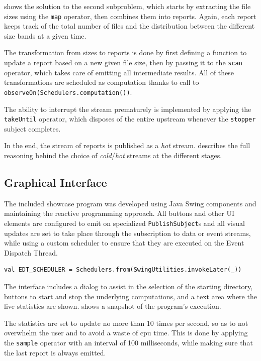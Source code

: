 \documentclass{scrartcl}
\begin{document}
 shows the solution to the second subproblem, which starts by extracting the file sizes using the \texttt{map} operator, then combines them into reports. Again, each report keeps track of the total number of files and the distribution between the different size bands at a given time.

The transformation from sizes to reports is done by first defining a function to update a report based on a new given file size, then by passing it to the \texttt{scan} operator, which takes care of emitting all intermediate results. All of these transformations are scheduled as computation thanks to call to \texttt{observeOn(Schedulers.computation())}.

The ability to interrupt the stream prematurely is implemented by applying the \texttt{takeUntil} operator, which disposes of the entire upstream whenever the \texttt{stopper} subject completes.

In the end, the stream of reports is published as a \textit{hot} stream.  describes the full reasoning behind the choice of \textit{cold}/\textit{hot} streams at the different stages.

\subsection{Graphical Interface}

The included showcase program was developed using Java Swing components and maintaining the reactive programming approach. All buttons and other UI elements are configured to emit on specialized \texttt{PublishSubject}s and all visual updates are set to take place through the subscription to data or event streams, while using a custom scheduler to ensure that they are executed on the Event Dispatch Thread.

\begin{lstlisting}[style=scala]
val EDT_SCHEDULER = Schedulers.from(SwingUtilities.invokeLater(_))
\end{lstlisting}

The interface includes a dialog to assist in the selection of the starting directory, buttons to start and stop the underlying computations, and a text area where the live statistics are shown.  shows a snapshot of the program's execution.

The statistics are set to update no more than 10 times per second, so as to not overwhelm the user and to avoid a waste of cpu time. This is done by applying the \texttt{sample} operator with an interval of 100 milliseconds, while making sure that the last report is always emitted.
\end{document}
